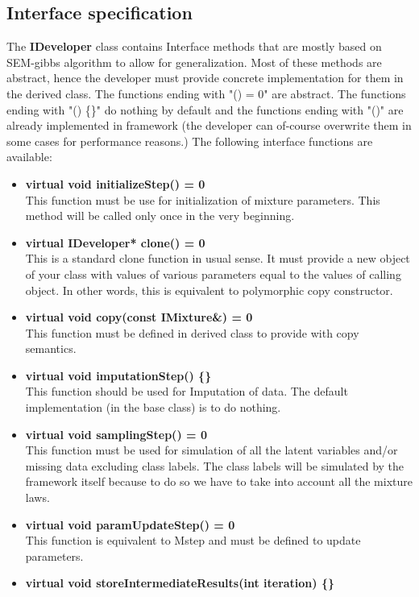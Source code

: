 \documentclass[a4paper,11pt]{article}
\begin{document}
\subsection{Interface specification}
The {\bf IDeveloper} class contains Interface methods that 
are mostly based on SEM-gibbs algorithm to allow for generalization. Most of these methods are abstract, hence the developer must provide
concrete implementation for them in the derived class. The functions ending with "() = 0" are abstract. The functions ending with "() \{\}" do nothing by default and the functions
ending with "()" are already implemented in framework (the developer can of-course
overwrite them in some cases for performance reasons.) The following interface functions are available:
\begin{itemize}
\item {\bf virtual void initializeStep() = 0} \\
This function must be use for initialization of mixture parameters.
This method will be called only once in the very beginning.
\item {\bf virtual IDeveloper* clone() = 0} \\
This is a standard clone function in usual sense. It must provide a new object of your class with values of various parameters equal to the values of calling
object. In other words, this is equivalent to polymorphic copy constructor. 
\item {\bf virtual void copy(const IMixture\&) = 0} \\
This function must be defined in derived class to provide with copy semantics. 
\item {\bf virtual void imputationStep() \{\}}\\
This function should be used for Imputation of data. The default implementation (in the base class) is to do nothing.
\item {\bf virtual void samplingStep() = 0} \\
This function must be used for simulation of all the latent variables and/or missing data
excluding class labels. The class labels will be simulated by the framework itself because to do so
we have to take into account all the mixture laws. 
\item {\bf virtual void paramUpdateStep() = 0}\\
This function is equivalent to Mstep and must be defined to update parameters.
\item {\bf virtual void storeIntermediateResults(int iteration) \{\}}\\

\end{itemize}
\end{document}
